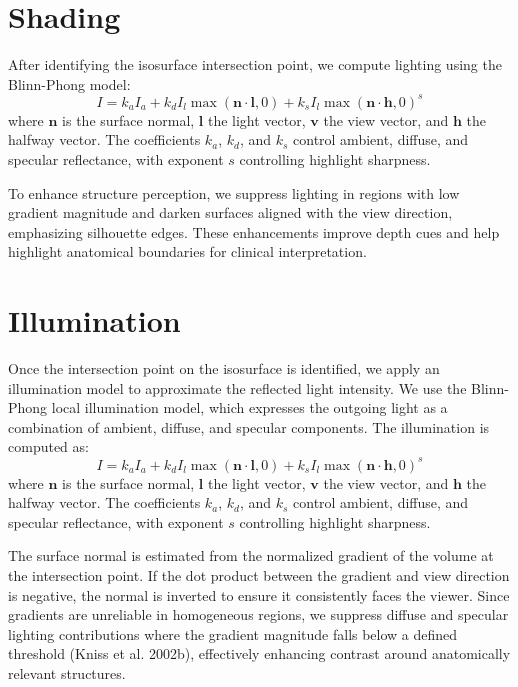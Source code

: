 \documentclass[conference]{IEEEtran}
\begin{document}
\section{Shading}

After identifying the isosurface intersection point, we compute lighting using the Blinn-Phong model:
\[
I = k_a I_a + k_d I_l \max(\mathbf{n} \cdot \mathbf{l}, 0) + k_s I_l \max(\mathbf{n} \cdot \mathbf{h}, 0)^s
\]
where $\mathbf{n}$ is the surface normal, $\mathbf{l}$ the light vector, $\mathbf{v}$ the view vector, and $\mathbf{h}$ the halfway vector. The coefficients $k_a$, $k_d$, and $k_s$ control ambient, diffuse, and specular reflectance, with exponent $s$ controlling highlight sharpness.

To enhance structure perception, we suppress lighting in regions with low gradient magnitude and darken surfaces aligned with the view direction, emphasizing silhouette edges. These enhancements improve depth cues and help highlight anatomical boundaries for clinical interpretation.

\section{Illumination}

Once the intersection point on the isosurface is identified, we apply an illumination model to approximate the reflected light intensity. We use the Blinn-Phong local illumination model, which expresses the outgoing light as a combination of ambient, diffuse, and specular components. The illumination is computed as:
\[
I = k_a I_a + k_d I_l \max(\mathbf{n} \cdot \mathbf{l}, 0) + k_s I_l \max(\mathbf{n} \cdot \mathbf{h}, 0)^s
\]
where $\mathbf{n}$ is the surface normal, $\mathbf{l}$ the light vector, $\mathbf{v}$ the view vector, and $\mathbf{h}$ the halfway vector. The coefficients $k_a$, $k_d$, and $k_s$ control ambient, diffuse, and specular reflectance, with exponent $s$ controlling highlight sharpness.

The surface normal is estimated from the normalized gradient of the volume at the intersection point. If the dot product between the gradient and view direction is negative, the normal is inverted to ensure it consistently faces the viewer. Since gradients are unreliable in homogeneous regions, we suppress diffuse and specular lighting contributions where the gradient magnitude falls below a defined threshold (Kniss et al. 2002b), effectively enhancing contrast around anatomically relevant structures.
\end{document}
